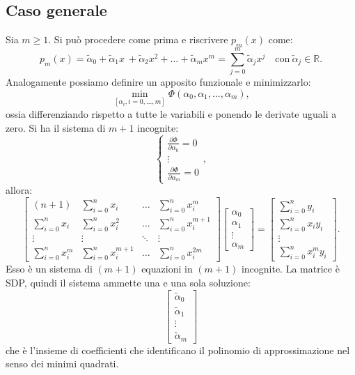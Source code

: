 \subsection{Caso generale}

Sia $m\geqslant 1$. Si può procedere come prima e riscrivere $p_{m}(x)$ come:
\begin{equation*}
p_{m}(x) =\tilde{\alpha }_{0} +\tilde{\alpha }_{1} x\ +\tilde{\alpha }_{2} x^{2} +\dotsc +\tilde{\alpha }_{m} x^{m} =\sum ^{m}_{j=0}\tilde{\alpha }_{j} x^{j} \quad \text{con} \ \tilde{\alpha }_{j} \in \mathbb{R}.
\end{equation*}
Analogamente possiamo definire un apposito funzionale e minimizzarlo:
\begin{equation*}
\min_{[ \alpha _{i} ,i=0,\dotsc ,m]} \Phi ( \alpha _{0} ,\alpha _{1} ,\dotsc ,\alpha _{m}),
\end{equation*}
ossia differenziando rispetto a tutte le variabili e ponendo le derivate uguali a zero.
Si ha il sistema di $m+1$ incognite:
\begin{equation*}
\begin{cases}
\displaystyle\frac{\partial \Phi }{\partial \alpha _{0}} =0\\
\vdots \\
\displaystyle\frac{\partial \Phi }{\partial \alpha _{m}} =0
\end{cases},
\end{equation*}
allora:
\begin{equation*}
\begin{bmatrix}
( n+1) & \sum ^{n}_{i=0} x_{i} & \dotsc  & \sum ^{n}_{i=0} x^{m}_{i}\\
\sum ^{n}_{i=0} x_{i} & \sum ^{n}_{i=0} x^{2}_{i} & \dotsc  & \sum ^{n}_{i=0} x^{m+1}_{i}\\
\vdots  & \vdots  & \ddots  & \vdots \\
\sum ^{n}_{i=0} x^{m}_{i} & \sum ^{n}_{i=0} x^{m+1}_{i} & \dotsc  & \sum ^{n}_{i=0} x^{2m}_{i}
\end{bmatrix}\begin{bmatrix}
\alpha _{0}\\
\alpha _{1}\\
\vdots \\
\alpha _{m}
\end{bmatrix} =\begin{bmatrix}
\sum ^{n}_{i=0} y_{i}\\
\sum ^{n}_{i=0} x_{i} y_{i}\\
\vdots \\
\sum ^{n}_{i=0} x^{m}_{i} y_{i}
\end{bmatrix}.
\end{equation*}
Esso è un sistema di $( m+1)$ equazioni in $( m+1)$ incognite. La matrice è SDP, quindi il sistema ammette una e una sola soluzione:
\begin{equation*}
\begin{bmatrix}
\tilde{\alpha }_{0}\\
\tilde{\alpha }_{1}\\
\vdots \\
\tilde{\alpha }_{m}
\end{bmatrix}
\end{equation*}
che è l'insieme di coefficienti che identificano il polinomio di approssimazione nel senso dei minimi quadrati.
